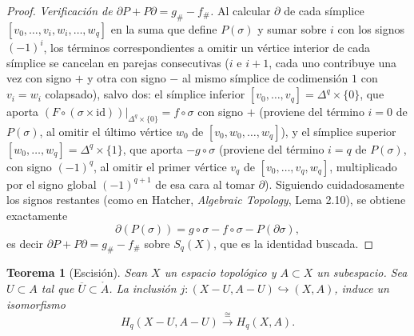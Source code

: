 \documentclass[11pt,a4paper]{article}
\theoremstyle{plain}
\newtheorem{theorem}{Teorema}[section]
\theoremstyle{definition}
\theoremstyle{remark}
\begin{document}
\begin{proof}
\emph{Verificación de $\partial P+P\partial=g_\#-f_\#$.} Al calcular
$\partial$ de cada símplice $[v_0,\dots,v_i,w_i,\dots,w_q]$ en la suma que
define $P(\sigma)$ y sumar sobre $i$ con los signos $(-1)^i$, los términos
correspondientes a omitir un vértice interior de cada símplice se cancelan
en parejas consecutivas ($i$ e $i+1$, cada uno contribuye una vez con
signo $+$ y otra con signo $-$ al mismo símplice de codimensión $1$ con
$v_i=w_i$ colapsado), salvo dos: el símplice inferior
$[v_0,\dots,v_q]=\Delta^q\times\{0\}$, que aporta
$(F\circ(\sigma\times\mathrm{id}))|_{\Delta^q\times\{0\}}=f\circ\sigma$ con
signo $+$ (proviene del término $i=0$ de $P(\sigma)$, al omitir el último
vértice $w_0$ de $[v_0,w_0,\dots,w_q]$), y el símplice superior
$[w_0,\dots,w_q]=\Delta^q\times\{1\}$, que aporta $-g\circ\sigma$
(proviene del término $i=q$ de $P(\sigma)$, con signo $(-1)^q$, al omitir
el primer vértice $v_q$ de $[v_0,\dots,v_q,w_q]$, multiplicado por el
signo global $(-1)^{q+1}$ de esa cara al tomar $\partial$). Siguiendo
cuidadosamente los signos restantes (como en Hatcher, \emph{Algebraic
Topology}, Lema 2.10), se obtiene exactamente
\[
\partial(P(\sigma))=g\circ\sigma-f\circ\sigma-P(\partial\sigma),
\]
es decir $\partial P+P\partial=g_\#-f_\#$ sobre $S_q(X)$, que es la
identidad buscada.
\end{proof}

\begin{theorem}[Escisión]
\label{thm:escision}
Sean $X$ un espacio topológico y $A\subset X$ un subespacio. Sea $U\subset A$
tal que $\overline U\subset\mathring A$. La inclusión
$j:(X-U,A-U)\hookrightarrow(X,A)$, induce un isomorfismo
\[
H_q(X-U,A-U)\overset{\cong}{\to}H_q(X,A).
\]
\end{theorem}
\end{document}
